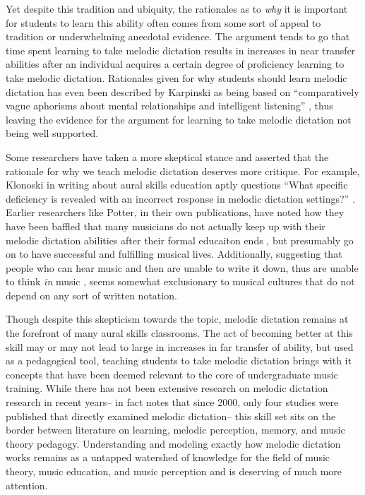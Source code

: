 \documentclass[]{book}
\begin{document}
Yet despite this tradition and ubiquity, the rationales as to \emph{why} it is important for students to learn this ability often comes from some sort of appeal to tradition or underwhelming anecdotal evidence.
The argument tends to go that time spent learning to take melodic dictation results in increases in near transfer abilities after an individual acquires a certain degree of proficiency learning to take melodic dictation.
Rationales given for why students should learn melodic dictation has even been described by Karpinski as being based on ``comparatively vague aphorisms about mental relationships and intelligent listening'' \citep[p.192]{karpinskiModelMusicPerception1990}, thus leaving the evidence for the argument for learning to take melodic dictation not being well supported.

Some researchers have taken a more skeptical stance and asserted that the rationale for why we teach melodic dictation deserves more critique.
For example, Klonoski in writing about aural skills education aptly questions ``What specific deficiency is revealed with an incorrect response in melodic dictation settings?'' \citep{klonoskiImprovingDictationAuralSkills2006}.
Earlier researchers like Potter, in their own publications, have noted how they have been baffled that many musicians do not actually keep up with their melodic dictation abilities after their formal educaiton ends \citep{potterIdentifyingSucessfulDictation1990}, but presumably go on to have successful and fulfilling musical lives.
Additionally, suggesting that people who can hear music and then are unable to write it down, thus are unable to think \emph{in} music \citep{karpinskiAuralSkillsAcquisition2000}, seems somewhat exclusionary to musical cultures that do not depend on any sort of written notation.

Though despite this skepticism towards the topic, melodic dictation remains at the forefront of many aural skills classrooms.
The act of becoming better at this skill may or may not lead to large in increases in far transfer of ability, but used as a pedagogical tool, teaching students to take melodic dictation brings with it concepts that have been deemed relevant to the core of undergraduate music training.
While there has not been extensive research on melodic dictation research in recent years-- in fact \citet{paneyEffectDirectingAttention2016} notes that since 2000, only four studies were published that directly examined melodic dictation-- this skill set sits on the border between literature on learning, melodic perception, memory, and music theory pedagogy.
Understanding and modeling exactly how melodic dictation works remains as a untapped watershed of knowledge for the field of music theory, music education, and music perception and is deserving of much more attention.
\end{document}
